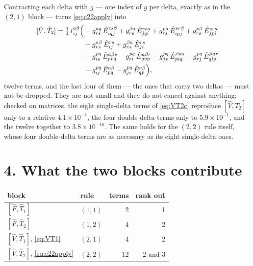 \documentclass[11pt]{article}
\newcommand{\E}[2]{\hat E^{#1}_{#2}}
\newcommand{\occ}{i}
\newcommand{\vir}{a}
\begin{document}
Contracting each delta with $g$ --- one index of $g$ per delta, exactly as in
the $(2,1)$ block --- turns \eqref{eq:c22apply} into
\begin{equation}
  \begin{aligned}
  [\hat V,\hat T_2]=\tfrac14\,t^{\vir\beta}_{\occ j}\Bigl(
   &+g^{\vir q}_{rs}\,\E{rs\beta}{\occ qj}
    +g^{\beta q}_{rs}\,\E{rs\vir}{jq\occ}
    +g^{p\vir}_{rs}\,\E{sr\beta}{\occ pj}
    +g^{p\beta}_{rs}\,\E{sr\vir}{jp\occ}\\
   &+g^{\vir\beta}_{rs}\,\E{rs}{\occ j}
    +g^{\beta\vir}_{rs}\,\E{rs}{j\occ}\\
   &-g^{pq}_{\occ s}\,\E{\vir\beta s}{pvq}
    -g^{pq}_{r\occ}\,\E{\vir\beta r}{qvp}
    -g^{pq}_{j s}\,\E{\beta\vir s}{p\occ q}
    -g^{pq}_{r j}\,\E{\beta\vir r}{q\occ p}\\
   &-g^{pq}_{\occ j}\,\E{\vir\beta}{pq}
    -g^{pq}_{j\occ}\,\E{\vir\beta}{qp}\Bigr),
  \end{aligned}
  \label{eq:VT2c}
\end{equation}
twelve terms, and the last four of them --- the ones that carry two deltas ---
must not be dropped. They are not small and they do not cancel against anything:
checked on matrices, the eight single-delta terms of \eqref{eq:VT2c} reproduce
$[\hat V,\hat T_2]$ only to a relative $4.1\times10^{-1}$, the four double-delta
terms only to $5.9\times10^{-1}$, and the twelve together to $3.8\times10^{-16}$.
The same holds for the $(2,2)$ rule itself, whose four double-delta terms are as
necessary as its eight single-delta ones.

\section*{4. What the two blocks contribute}

\begin{center}
\footnotesize
\begin{tabular}{@{}llrr@{}}
\toprule
block & rule & terms & rank out \\
\midrule
$[\hat F,\hat T_1]$ & $(1,1)$ & 2 & 1 \\
$[\hat F,\hat T_2]$ & $(1,2)$ & 4 & 2 \\
$[\hat V,\hat T_1]$, \eqref{eq:VT1} & $(2,1)$ & 4 & 2 \\
$[\hat V,\hat T_2]$, \eqref{eq:c22apply} & $(2,2)$ & 12 & 2 and 3 \\
\bottomrule
\end{tabular}
\end{center}
\end{document}
